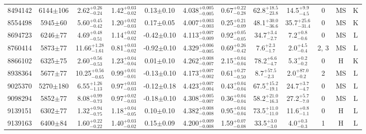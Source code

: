 \begin{longtable}{c|ccccc|ccc|ccc}
8494142 & 6144$\pm$106   & 2.62$_{-0.24}^{+0.26}$    & 1.42$_{-0.02}^{+0.03}$ & 0.13$\pm$0.10     & 4.038$_{-0.005}^{+0.005}$ & 0.67$_{-0.28}^{+0.22}$ & 62.8$_{-23.8}^{+18.5}$    & 14.5$_{-4.5}^{+9.9}$     & 0 &        MS & K \\
8554498 & 5945$\pm$60    & 5.60$_{-0.42}^{+0.45}$    & 1.20$_{-0.03}^{+0.02}$ & 0.17$\pm$0.05     & 4.007$_{-0.003}^{+0.003}$ & 0.25$_{-0.09}^{+0.21}$ & 48.1$_{-36.6}^{+30.0}$    & 35.7$_{-31.4}^{+25.6}$   & 0 &        MS & K \\
8694723 & 6246$\pm$77    & 4.69$_{-0.51}^{+0.48}$    & 1.14$_{-0.02}^{+0.02}$ & -0.42$\pm$0.10    & 4.113$_{-0.009}^{+0.007}$ & 0.92$_{-0.05}^{+0.05}$ & 34.7$_{-2.7}^{+3.4}$      & 7.2$_{-0.6}^{+0.8}$      & 0 &        MS & L \\
8760414 & 5873$\pm$77    & 11.66$_{-1.61}^{+1.28}$   & 0.81$_{-0.02}^{+0.03}$ & -0.92$\pm$0.10    & 4.329$_{-0.005}^{+0.006}$ & 0.69$_{-0.42}^{+0.26}$ & 7.6$_{-1.7}^{+2.3}$       & 2.0$_{-0.4}^{+4.5}$      & 2, 3 &        MS & L \\
8866102 & 6325$\pm$75    & 2.60$_{-0.53}^{+0.56}$    & 1.23$_{-0.04}^{+0.04}$ & 0.01$\pm$0.10     & 4.262$_{-0.007}^{+0.008}$ & 2.15$_{-0.04}^{+0.04}$ & 78.2$_{-4.7}^{+6.6}$      & 5.3$_{-0.2}^{+0.2}$      & 0 &        H & K \\
8938364 & 5677$\pm$77    & 10.25$_{-0.65}^{+0.56}$   & 0.99$_{-0.01}^{+0.01}$ & -0.13$\pm$0.10    & 4.173$_{-0.002}^{+0.007}$ & 0.61$_{-0.50}^{+0.27}$ & 8.7$_{-2.3}^{+57.5}$      & 2.0$_{-0.2}^{+87.0}$     & 2 &        MS & L \\
9025370 & 5270$\pm$180   & 6.55$_{-1.13}^{+1.26}$    & 0.97$_{-0.03}^{+0.03}$ & -0.12$\pm$0.18    & 4.423$_{-0.004}^{+0.007}$ & 0.43$_{-0.04}^{+0.04}$ & 67.5$_{-19.1}^{+15.2}$    & 24.7$_{-4.7}^{+3.7}$     & 0 &        MS & L \\
9098294 & 5852$\pm$77    & 8.08$_{-0.73}^{+0.99}$    & 0.97$_{-0.03}^{+0.02}$ & -0.18$\pm$0.10    & 4.308$_{-0.007}^{+0.005}$ & 0.36$_{-0.04}^{+0.04}$ & 58.2$_{-16.3}^{+21.0}$    & 27.2$_{-7.0}^{+5.7}$     & 0 &        MS & L \\
9139151 & 6302$\pm$77    & 1.32$_{-0.75}^{+0.94}$    & 1.18$_{-0.05}^{+0.04}$ & 0.10$\pm$0.10     & 4.382$_{-0.008}^{+0.008}$ & 0.95$_{-0.04}^{+0.04}$ & 73.5$_{-11.0}^{+11.0}$    & 11.6$_{-1.1}^{+0.8}$     & 0 &        H & L \\
9139163 & 6400$\pm$84    & 1.60$_{-0.22}^{+0.22}$    & 1.40$_{-0.02}^{+0.03}$ & 0.15$\pm$0.09     & 4.200$_{-0.008}^{+0.009}$ & 1.59$_{-0.08}^{+0.07}$ & 33.5$_{-3.0}^{+3.0}$      & 4.0$_{-0.3}^{+0.3}$      & 1 &        H & L \\

\end{longtable}
